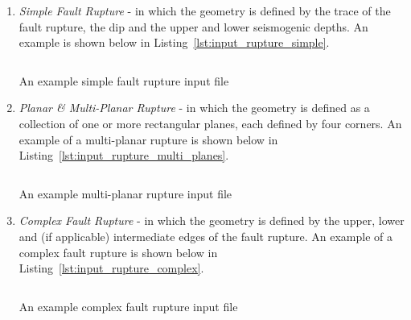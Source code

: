 \begin{enumerate}

    \item \emph{Simple Fault Rupture} - in which the geometry is defined by the
    trace of the fault rupture, the dip and the upper and lower seismogenic
    depths. An example is shown below in Listing~\ref{lst:input_rupture_simple}.

\begin{listing}[htbp]
  \inputminted[firstline=1,firstnumber=1,fontsize=\footnotesize,frame=single,linenos,bgcolor=lightgray]{xml}{oqum/hazard/verbatim/input_rupture_simple_fault.xml}
  \caption{An example simple fault rupture input file}
  \label{lst:input_rupture_simple}
\end{listing}

    \item \emph{Planar \& Multi-Planar Rupture} - in which the geometry is
    defined as a collection of one or more rectangular planes, each defined
    by four corners. An example of a multi-planar rupture is shown below
    in Listing~\ref{lst:input_rupture_multi_planes}.

\begin{listing}[htbp]
  \inputminted[firstline=1,firstnumber=1,fontsize=\footnotesize,frame=single,linenos,bgcolor=lightgray]{xml}{oqum/hazard/verbatim/input_rupture_multi_planes.xml}
  \caption{An example multi-planar rupture input file}
  \label{lst:input_rupture_multi_planes}
\end{listing}

    \item \emph{Complex Fault Rupture} - in which the geometry is defined by
    the upper, lower and (if applicable) intermediate edges of the fault
    rupture. An example of a complex fault rupture is shown below in
    Listing~\ref{lst:input_rupture_complex}.

\begin{listing}[htbp]
  \inputminted[firstline=1,firstnumber=1,fontsize=\footnotesize,frame=single,linenos,bgcolor=lightgray]{xml}{oqum/hazard/verbatim/input_rupture_complex.xml}
  \caption{An example complex fault rupture input file}
  \label{lst:input_rupture_complex}
\end{listing}

\end{enumerate}
